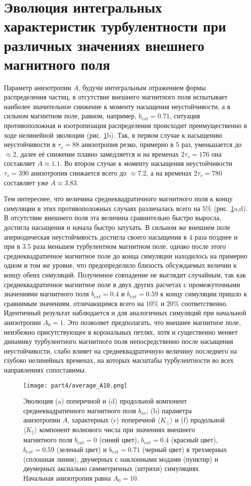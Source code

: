 \section{Эволюция интегральных характеристик турбулентности при различных значениях внешнего магнитного поля}
\label{part_evol_aver}


Параметр анизотропии $A$, будучи интегральным отражением формы распределения частиц, в отсутствие внешнего магнитного поля испытывает наиболее значительное снижение к моменту насыщения неустойчивости, а в сильном магнитном поле, равном, например, $b_{ext}=0.71$, ситуация противоположная и изотропизация распределения происходит преимущественно в ходе нелинейной эволюции (рис. \ref{ris:average_A10}b). Так, в первом случае к насыщению неустойчивости в $\tau_s=88$ анизотропия резко, примерно в 5 раз, уменьшается до $\approx2$, далее её снижение плавно замедляется и на временах $2\tau_s=176$ она составляет $A\approx1.1$. Во втором случае к моменту насыщения неустойчивости $\tau_s=390$ анизотропия снижается всего до $\approx7.2$, а на временах $2\tau_s=780$ составляет уже $A\approx3.83$.

Тем интереснее, что величина среднеквадратичного магнитного поля к концу симуляции в этих противоположных случаях различалась всего на $5 \%$ (рис. \ref{ris:average_A10}a,d). В отсутствие внешнего поля эта величина сравнительно быстро выросла, достигла насыщения и начала быстро затухать. В сильном же внешнем поле апериодическая неустойчивость достигла своего насыщения в $4$ раза позднее и при в $3.5$ раза меньшем турбулентном магнитном поле, однако после этого  среднеквадратичное магнитное поле до конца симуляции находилось на примерно одном и том же уровне, что предопределило близость обсуждаемых величин к концу обеих симуляций. Полученное совпадение не выглядит случайным, так как среднеквадратичное магнитное поле в двух других расчетах с промежуточными значениями магнитного поля $b_{ext}=0.4$ и $b_{ext}=0.59$ к концу симуляции пришло к сравнимым значениям, отличающимся всего на $10 \%$ и $20 \%$ соответственно. Идентичный результат наблюдается и для аналогичных симуляций при начальной анизотропии $A_0=1$. Это позволяет предполагать, что внешнее магнитное поле, неизбежно присутствующее в корональных петлях, хотя и существенно меняет динамику турбулентного магнитного поля непосредственно после насыщения неустойчивости, слабо влияет на среднеквадратичную величину последнего на глубоко нелинейных временах, на которых масштабы турбулентности во всех направлениях сопоставимы. 
\begin{figure}[h]
\texttt{[image: part4/average\_A10.png]}
\caption{Эволюция (a) поперечной и (d) продольной компонент среднеквадратичного магнитного поля $b_{av}$, (b) параметра анизотропии $A$, характерных (c) поперечной $\langle K_\perp\rangle$ и (f) продольной $\langle K_\|\rangle$ компонент волнового числа при значениях внешнего магнитного поля $b_{ext}=0$ (синий цвет), $b_{ext}=0.4$ (красный цвет), $b_{ext}=0.59$ (зеленый цвет) и $b_{ext}=0.71$ (черный цвет) в трехмерных (сплошная линия), двумерных с наклонными модами (пунктир) и двумерных аксиально симметричных (штрихи) симуляциях. Начальная анизотропия равна $A_0=10$.}
\label{ris:average_A10}
\end{figure}

